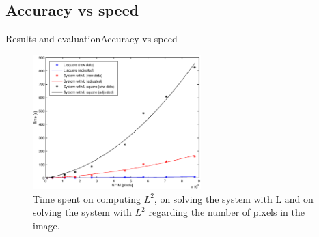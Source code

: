 \documentclass[10pt]{beamer}
\begin{document}
\subsection{Accuracy vs speed}
\begin{frame}{Results and evaluation}{Accuracy vs speed}

\begin{figure}[H]
    \centering
    \includegraphics[trim = 9mm 7mm 9mm 10mm, clip, width=6.5cm]{figures/x_LL2_time.eps}
    \caption{Time spent on computing $L^{2}$, on solving the system with L and on solving the system with $L^{2}$ regarding the number of pixels in the image.}
    \label{fig:time_L_vs_L2}
\end{figure}

\end{frame}
\end{document}
